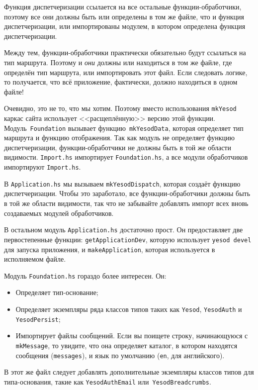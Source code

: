 Функция диспетчеризации ссылается на все остальные функции-обработчики, поэтому
все они должны быть или определены в том же файле, что и функция
диспетчеризации, или импортированы модулем, в котором определена функция
диспетчеризации.

Между тем, функции-обработчики практически обязательно будут ссылаться на тип
маршрута. Поэтому и \emph{они} должны или находиться в том же файле, где
определён тип маршрута, или импортировать этот файл.  Если следовать логике, то
получается, что всё приложение, фактически, должно находиться в одном файле!

Очевидно, это не то, что мы хотим. Поэтому вместо использования
\lstinline!mkYesod! каркас сайта использует <<расщеплённую>> версию этой
функции. Модуль~\lstinline!Foundation! вызывает функцию~\lstinline!mkYesodData!,
которая определяет тип маршрута и функцию отображения. Так как модуль не
определяет функцию диспетчеризации, функции-обработчики не должны быть в той же
области видимости. \texttt{Import.hs} импортирует \texttt{Foundation.hs}, а все
модули обработчиков импортируют \texttt{Import.hs}.

В \texttt{Application.hs} мы вызываем \lstinline!mkYesodDispatch!, которая
создаёт функцию диспетчеризации.  Чтобы это заработало, все функции-обработчики
должны быть в той же области видимости, так что не забывайте добавлять импорт
всех вновь создаваемых модулей обработчиков.

В остальном модуль \texttt{Application.hs} достаточно прост. Он предоставляет
две первостепенные функции: \lstinline!getApplicationDev!, которую использует \texttt{yesod devel} для
запуска приложения, и \lstinline!makeApplication!, которая используется в исполняемом
файле.

Модуль \texttt{Foundation.hs} гораздо более интересен. Он:
\begin{itemize}
  \item Определяет тип-основание;
  \item Определяет экземпляры ряда классов типов таких как \lstinline!Yesod!,
      \lstinline!YesodAuth! и \lstinline!YesodPersist!;
  \item Импортирует файлы сообщений. Если вы поищете строку, начинающуюся с
      \lstinline!mkMessage!, то увидите, что она определяет каталог, в котором
      находятся сообщения (\lstinline!messages!), и язык по умолчанию
      (\lstinline!en!, для английского).
\end{itemize}

В этот же файл следует добавлять дополнительные экземпляры классов типов для
типа-основания, такие как \lstinline!YesodAuthEmail!
или~\lstinline!YesodBreadcrumbs!.

